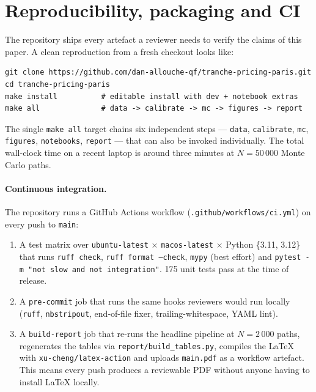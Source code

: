 \section{Reproducibility, packaging and CI}\label{app:reproducibility}

The repository ships every artefact a reviewer needs to verify the claims
of this paper. A clean reproduction from a fresh checkout looks like:

\begin{verbatim}
git clone https://github.com/dan-allouche-qf/tranche-pricing-paris.git
cd tranche-pricing-paris
make install          # editable install with dev + notebook extras
make all              # data -> calibrate -> mc -> figures -> report
\end{verbatim}

The single \texttt{make all} target chains six independent steps —
\texttt{data}, \texttt{calibrate}, \texttt{mc}, \texttt{figures},
\texttt{notebooks}, \texttt{report} — that can also be invoked
individually. The total wall-clock time on a recent laptop is around
three minutes at $N = 50\,000$ Monte Carlo paths.

\paragraph{Continuous integration.}
The repository runs a GitHub Actions workflow
(\texttt{.github/workflows/ci.yml}) on every push to \texttt{main}:

\begin{enumerate}
  \item A test matrix over \texttt{ubuntu-latest} $\times$
        \texttt{macos-latest} $\times$ Python \{3.11, 3.12\} that runs
        \texttt{ruff check}, \texttt{ruff format --check},
        \texttt{mypy} (best effort) and \texttt{pytest -m "not slow and
        not integration"}. 175 unit tests pass at the time of release.
  \item A \texttt{pre-commit} job that runs the same hooks reviewers
        would run locally (\texttt{ruff}, \texttt{nbstripout},
        end-of-file fixer, trailing-whitespace, YAML lint).
  \item A \texttt{build-report} job that re-runs the headline pipeline
        at $N = 2\,000$ paths, regenerates the tables via
        \texttt{report/build\_tables.py}, compiles the LaTeX with
        \texttt{xu-cheng/latex-action} and uploads \texttt{main.pdf}
        as a workflow artefact. This means every push produces a
        reviewable PDF without anyone having to install \LaTeX{} locally.
\end{enumerate}

